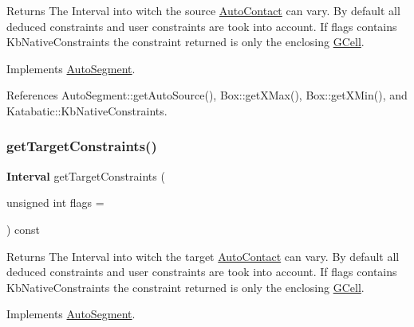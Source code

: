 \begin{DoxyReturn}{Returns}
The Interval into witch the source \hyperlink{classKatabatic_1_1AutoContact}{Auto\+Contact} can vary. By default all deduced constraints and user constraints are took into account. If {\ttfamily flags} contains {\ttfamily Kb\+Native\+Constraints} the constraint returned is only the enclosing \hyperlink{classKatabatic_1_1GCell}{G\+Cell}. 
\end{DoxyReturn}


Implements \hyperlink{classKatabatic_1_1AutoSegment_ab7685e309e1d910db3e8237f8a898c35}{Auto\+Segment}.



References Auto\+Segment\+::get\+Auto\+Source(), Box\+::get\+X\+Max(), Box\+::get\+X\+Min(), and Katabatic\+::\+Kb\+Native\+Constraints.

\mbox{\label{classKatabatic_1_1AutoVertical_ad2b5aeb2604548378c8d78c60862091f}} 
\subsubsection{\texorpdfstring{get\+Target\+Constraints()}{getTargetConstraints()}}
{\footnotesize\ttfamily \textbf{ Interval} get\+Target\+Constraints (\begin{DoxyParamCaption}\item[{unsigned int}]{flags = {} }\end{DoxyParamCaption}) const\hspace{0.3cm}{\ttfamily [virtual]}}

\begin{DoxyReturn}{Returns}
The Interval into witch the target \hyperlink{classKatabatic_1_1AutoContact}{Auto\+Contact} can vary. By default all deduced constraints and user constraints are took into account. If {\ttfamily flags} contains {\ttfamily Kb\+Native\+Constraints} the constraint returned is only the enclosing \hyperlink{classKatabatic_1_1GCell}{G\+Cell}. 
\end{DoxyReturn}


Implements \hyperlink{classKatabatic_1_1AutoSegment_a9c1b8b3cd57fb7b0bf60c7a6148237c2}{Auto\+Segment}.



